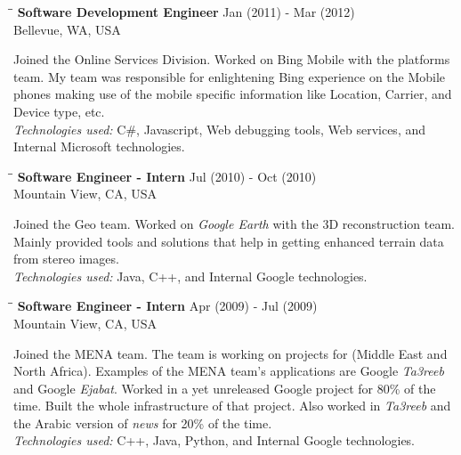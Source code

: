 \documentclass{res}
\begin{document}
\begin{resume}
   \begin{tabbing}
   \hspace{2.3in}\= \hspace{2.3in}\= \kill %
    {\bf Software Development Engineer}\> \hfill Jan (2011) - Mar (2012)\\
                                    \>Bellevue, WA, USA
   \end{tabbing}\vspace{-20pt}      %
    Joined the Online Services Division. Worked on Bing Mobile with the platforms team.
    My team was responsible for enlightening Bing experience on the Mobile phones making use of the mobile specific information like
    Location, Carrier, and Device type, etc.\\
    {\sl Technologies used:} C\#, Javascript, Web debugging tools, Web services, and Internal Microsoft technologies.

   \begin{tabbing}
   \hspace{2.3in}\= \hspace{2.3in}\= \kill %
    {\bf Software Engineer - Intern}\> \hfill Jul (2010) - Oct (2010)\\
                                    \>Mountain View, CA, USA
   \end{tabbing}\vspace{-20pt}      %
    Joined the Geo team. Worked on {\sl Google Earth} with the 3D reconstruction team.
    Mainly provided tools and solutions that help in getting enhanced terrain data from stereo images.\\
    {\sl Technologies used:} Java, C++, and Internal Google technologies.

   \begin{tabbing}
   \hspace{2.3in}\= \hspace{2.3in}\= \kill %
    {\bf Software Engineer - Intern}\> \hfill Apr (2009) - Jul (2009)\\
                                    \>Mountain View, CA, USA
   \end{tabbing}\vspace{-20pt}      %
    Joined the MENA team. The team is working on projects for (Middle East and North Africa). Examples of
    the MENA team's applications are Google {\sl Ta3reeb} and Google {\sl Ejabat}. Worked in a yet unreleased
    Google project for 80\% of the time. Built the whole infrastructure of that project. Also worked
    in {\sl Ta3reeb} and the Arabic version of {\sl news} for 20\% of the time.\\
    {\sl Technologies used:} C++, Java, Python, and Internal Google technologies.


\end{resume}
\end{document}
